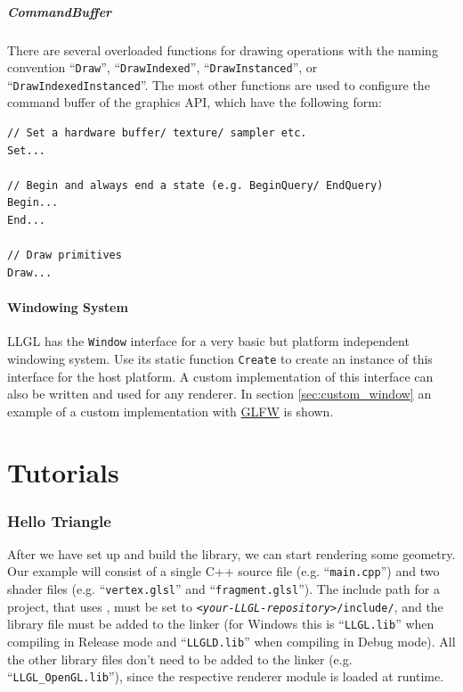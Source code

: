 \documentclass{article}
\begin{document}
\subsubsection{CommandBuffer}

There are several overloaded functions for drawing operations with the naming convention
``\texttt{Draw}'', ``\texttt{DrawIndexed}'', ``\texttt{DrawInstanced}'', or ``\texttt{DrawIndexedInstanced}''.
The most other functions are used to configure the command buffer of the graphics API, which have the following form:
\begin{lstlisting}
// Set a hardware buffer/ texture/ sampler etc.
Set...

// Begin and always end a state (e.g. BeginQuery/ EndQuery)
Begin...
End...

// Draw primitives
Draw...
\end{lstlisting}

\subsection{Windowing System}

LLGL has the \texttt{Window} interface for a very basic but platform independent windowing system.
Use its static function \texttt{Create} to create an instance of this interface for the host platform.
A custom implementation of this interface can also be written and used for any renderer.
In section \ref{sec:custom_window} an example of a custom implementation with \href{http://www.glfw.org/}{GLFW} is shown.



\newpage
\part{Tutorials}

\section{Hello Triangle}

After we have set up and build the library, we can start rendering some geometry.
Our example will consist of a single C++ source file (e.g. ``\texttt{main.cpp}'') and two shader files
(e.g. ``\texttt{vertex.glsl}'' and ``\texttt{fragment.glsl}'').
The include path for a project, that uses \LLGL, must be set to \texttt{\textit{<your-LLGL-repository>}/include/},
and the \LLGL library file must be added to the linker (for Windows this is ``\texttt{LLGL.lib}''
when compiling in Release mode and ``\texttt{LLGLD.lib}'' when compiling in Debug mode).
All the other library files don't need to be added to the linker (e.g. ``\texttt{LLGL\_OpenGL.lib}''),
since the respective renderer module is loaded at runtime.
\end{document}
